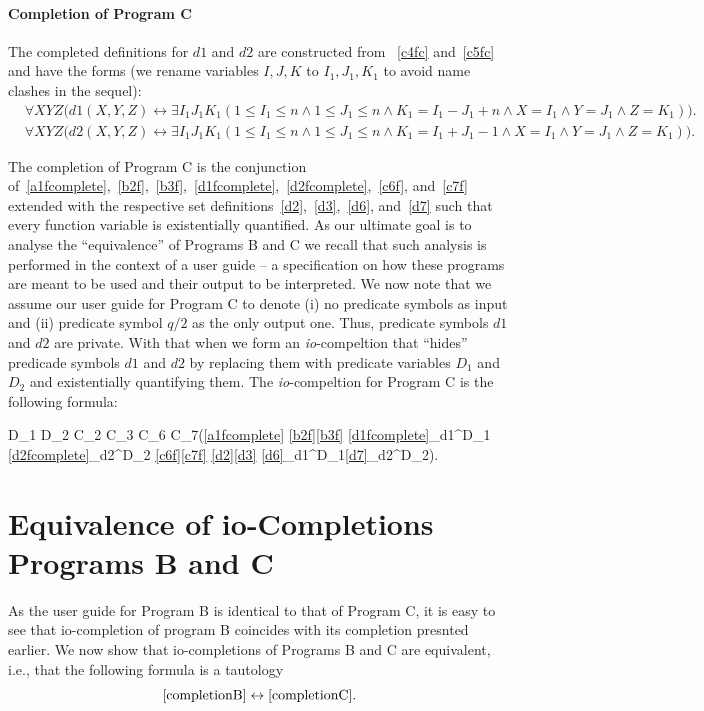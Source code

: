 \documentclass{article}
\newcommand{\sub}[3]{#1_{#2}^{#3}}
\begin{document}
\paragraph{Completion of Program C}
The completed definitions for $d1$ and $d2$ are constructed from ~\eqref{c4fc} and~\eqref{c5fc} and have the forms (we rename variables $I,J,K$ to $I_1,J_1,K_1$ to avoid name clashes in the sequel): 
\begin{align}
    &\forall 
X Y Z
\Big(d1(X,Y,Z)
\leftrightarrow \exists I_1 J_1 K_1    
(1\leq I_1\leq n\wedge 1\leq J_1\leq n \wedge K_1=I_1-J_1+n
\wedge X=I_1 \wedge Y=J_1 \wedge Z=K_1 ) 
   \Big).\label{d1fcomplete}\\
&\forall  
X Y Z
\Big(d2(X,Y,Z) \leftrightarrow \exists I_1 J_1 K_1
    (1\leq I_1\leq n\wedge 1\leq J_1\leq n \wedge K_1=I_1+J_1-1 
\wedge X=I_1 \wedge Y=J_1 \wedge Z=K_1 )
   \Big).\label{d2fcomplete}
\end{align}

The completion of Program C is the conjunction of~\eqref{a1fcomplete},~\eqref{b2f},~\eqref{b3f},~\eqref{d1fcomplete},~\eqref{d2fcomplete},~\eqref{c6f}, and~\eqref{c7f}  extended with the respective set definitions~\eqref{d2},~\eqref{d3},~\eqref{d6}, and~\eqref{d7} such that every function variable is existentially quantified.
As our ultimate goal is to analyse the ``equivalence'' of Programs B and C we 
recall that such analysis is performed in the context of a user guide -- a specification on how these programs are meant to be used and their output to be interpreted.
We now note that we assume our user guide for Program C to denote (i) no predicate symbols as input and 
(ii) predicate symbol $q/2$ as the only output one.
Thus, predicate symbols $d1$ and $d2$ are private.
With that when we form an {\em io}-compeltion that ``hides'' predicade symbols 
$d1$ and $d2$ by replacing them with predicate variables $D_1$ and $D_2$ and  existentially quantifying them. The {\em io}-compeltion for Program C is the following formula:

\beq
\exists D_1 D_2 C_2 C_3 C_6 C_7\Big(\eqref{a1fcomplete}\wedge
\eqref{b2f}\wedge\eqref{b3f}\wedge
\sub{\eqref{d1fcomplete}}{d1}{D_1}\wedge 
\sub{\eqref{d2fcomplete}}{d2}{D_2}\wedge 
\eqref{c6f}\wedge\eqref{c7f}
\wedge\eqref{d2}\wedge\eqref{d3}\wedge
\sub{\eqref{d6}}{d1}{D_1}\wedge\sub{\eqref{d7}}{d2}{D_2}\Big).

\section{Equivalence of io-Completions Programs B and C}
As the user guide for Program B is identical to that of Program C, it is easy to see that io-completion of program B coincides with its completion presnted earlier.
We now show that io-completions of Programs B and C are equivalent, i.e., that the following formula is a tautology
$$
\eqref{completionB}
\leftrightarrow
\eqref{completionC}.
$$
\end{document}
